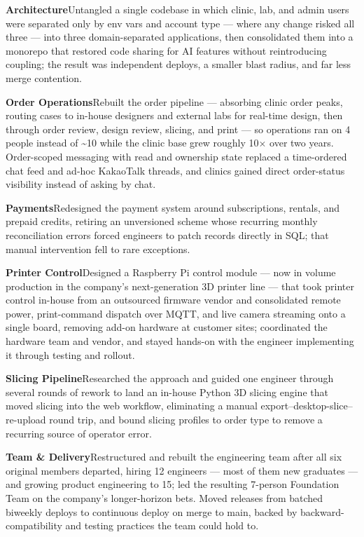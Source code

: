 \begin{cventries}
{\begin{cvitems}
        \item {\textbf{Architecture}\enspace Untangled a single codebase in which clinic, lab, and admin users were separated only by env vars and account type — where any change risked all three — into three domain-separated applications, then consolidated them into a monorepo that restored code sharing for AI features without reintroducing coupling; the result was independent deploys, a smaller blast radius, and far less merge contention.}
        \item {\textbf{Order Operations}\enspace Rebuilt the order pipeline — absorbing clinic order peaks, routing cases to in-house designers and external labs for real-time design, then through order review, design review, slicing, and print — so operations ran on 4 people instead of \textasciitilde10 while the clinic base grew roughly 10$\times$ over two years. Order-scoped messaging with read and ownership state replaced a time-ordered chat feed and ad-hoc KakaoTalk threads, and clinics gained direct order-status visibility instead of asking by chat.}
        \item {\textbf{Payments}\enspace Redesigned the payment system around subscriptions, rentals, and prepaid credits, retiring an unversioned scheme whose recurring monthly reconciliation errors forced engineers to patch records directly in SQL; that manual intervention fell to rare exceptions.}
        \item {\textbf{Printer Control}\enspace Designed a Raspberry Pi control module — now in volume production in the company’s next-generation 3D printer line — that took printer control in-house from an outsourced firmware vendor and consolidated remote power, print-command dispatch over MQTT, and live camera streaming onto a single board, removing add-on hardware at customer sites; coordinated the hardware team and vendor, and stayed hands-on with the engineer implementing it through testing and rollout.}
        \item {\textbf{Slicing Pipeline}\enspace Researched the approach and guided one engineer through several rounds of rework to land an in-house Python 3D slicing engine that moved slicing into the web workflow, eliminating a manual export--desktop-slice--re-upload round trip, and bound slicing profiles to order type to remove a recurring source of operator error.}
        \item {\textbf{Team \& Delivery}\enspace Restructured and rebuilt the engineering team after all six original members departed, hiring 12 engineers — most of them new graduates — and growing product engineering to 15; led the resulting 7-person Foundation Team on the company’s longer-horizon bets. Moved releases from batched biweekly deploys to continuous deploy on merge to main, backed by backward-compatibility and testing practices the team could hold to.}

\end{cvitems}}
\end{cventries}
